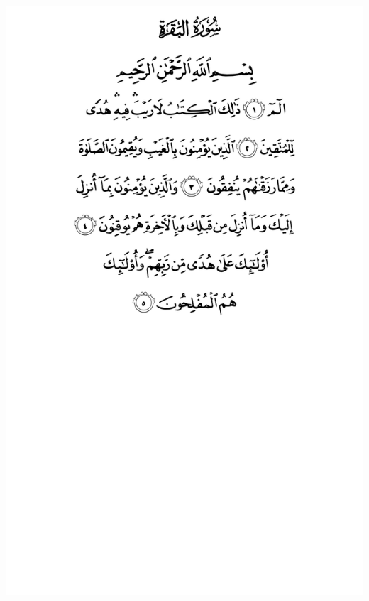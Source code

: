 \documentclass[10pt]{article}
\begin{document}
\begin{center}
\includegraphics[width=\textwidth,height=\textheight,keepaspectratio]{images/002.png}\newpage

\end{center}
\end{document}
